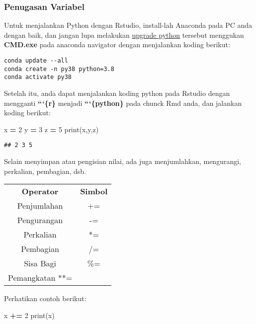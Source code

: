\documentclass[
]{docs}
\newenvironment{Shaded}{\begin{snugshade}}{\end{snugshade}}
\newcommand{\BuiltInTok}[1]{#1}
\newcommand{\DecValTok}[1]{\textcolor[rgb]{0.00,0.00,0.81}{#1}}
\newcommand{\NormalTok}[1]{#1}
\newcommand{\OperatorTok}[1]{\textcolor[rgb]{0.81,0.36,0.00}{\textbf{#1}}}
\begin{document}
\hypertarget{penugasan-variabel}{%
\subsubsection{Penugasan Variabel}\label{penugasan-variabel}}

Untuk menjalankan Python dengan Rstudio, install-lah Anaconda pada PC anda dengan baik, dan jangan lupa melakukan \href{https://stackoverflow.com/questions/58568175/upgrade-to-python-3-8-using-conda}{upgrade python} tersebut menggukan \textbf{CMD.exe} pada anaconda navigator dengan menjalankan koding berikut:

\begin{verbatim}
conda update --all
conda create -n py38 python=3.8
conda activate py38
\end{verbatim}

Setelah itu, anda dapat menjalankan koding python pada Rstudio dengan mengganti \textbf{```\{r\}} menjadi \textbf{```\{python\}} pada chunck Rmd anda, dan jalankan koding berikut:

\begin{Shaded}
\begin{Highlighting}[]
\NormalTok{x }\OperatorTok{=} \DecValTok{2}
\NormalTok{y }\OperatorTok{=} \DecValTok{3} 
\NormalTok{z }\OperatorTok{=} \DecValTok{5} 
\BuiltInTok{print}\NormalTok{(x,y,z)}
\end{Highlighting}
\end{Shaded}

\begin{verbatim}
## 2 3 5
\end{verbatim}

Selain menyimpan atau pengisian nilai, ada juga menjumlahkan, mengurangi, perkalian, pembagian, dsb.

\begin{longtable}[]{@{}cc@{}}
\toprule()
\endhead
\textbf{Operator} & \textbf{Simbol} \\
Penjumlahan & += \\
Pengurangan & -= \\
Perkalian & *= \\
Pembagian & /= \\
Sisa Bagi & \%= \\
Pemangkatan **= & \\
\bottomrule()
\end{longtable}

Perhatikan contoh berikut:

\begin{Shaded}
\begin{Highlighting}[]
\NormalTok{x }\OperatorTok{+=} \DecValTok{2}
\BuiltInTok{print}\NormalTok{(x)}
\end{Highlighting}
\end{Shaded}
\end{document}
